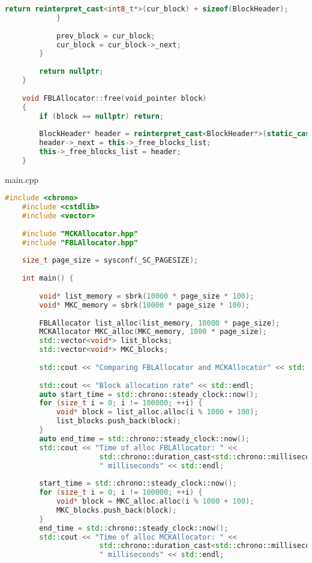 \documentclass[a4paper, 12pt]{article}
\begin{document}
\begin{lstlisting}[language=C++]
                return reinterpret_cast<int8_t*>(cur_block) + sizeof(BlockHeader);
            }
    
            prev_block = cur_block;
            cur_block = cur_block->_next;
        }
    
        return nullptr;
    }
    
    void FBLAllocator::free(void_pointer block)
    {
        if (block == nullptr) return;
    
        BlockHeader* header = reinterpret_cast<BlockHeader*>(static_cast<int8_t*>(block) - sizeof(BlockHeader));
        header->_next = this->_free_blocks_list;
        this->_free_blocks_list = header;
    }
\end{lstlisting}

main.cpp
\begin{lstlisting}[language=C++]
    #include <chrono>
    #include <cstdlib>
    #include <vector>
    
    #include "MCKAllocator.hpp"
    #include "FBLAllocator.hpp"
    
    size_t page_size = sysconf(_SC_PAGESIZE);
    
    int main() {
    
        void* list_memory = sbrk(10000 * page_size * 100); 
        void* MKC_memory = sbrk(10000 * page_size * 100);
    
        FBLAllocator list_alloc(list_memory, 10000 * page_size);
        MCKAllocator MKC_alloc(MKC_memory, 1000 * page_size);
        std::vector<void*> list_blocks;
        std::vector<void*> MKC_blocks;
    
        std::cout << "Comparing FBLAllocator and MCKAllocator" << std::endl;
    
        std::cout << "Block allocation rate" << std::endl;
        auto start_time = std::chrono::steady_clock::now();
        for (size_t i = 0; i != 100000; ++i) {
            void* block = list_alloc.alloc(i % 1000 + 100);
            list_blocks.push_back(block);
        }
        auto end_time = std::chrono::steady_clock::now();
        std::cout << "Time of alloc FBLAllocator: " << 
                      std::chrono::duration_cast<std::chrono::milliseconds>(end_time - start_time).count() << 
                      " milliseconds" << std::endl;
    
        start_time = std::chrono::steady_clock::now();
        for (size_t i = 0; i != 100000; ++i) {
            void* block = MKC_alloc.alloc(i % 1000 + 100);
            MKC_blocks.push_back(block);
        }
        end_time = std::chrono::steady_clock::now();
        std::cout << "Time of alloc MCKAllocator: " << 
                      std::chrono::duration_cast<std::chrono::milliseconds>(end_time - start_time).count() << 
                      " milliseconds" << std::endl;
    

\end{lstlisting}
\end{document}
